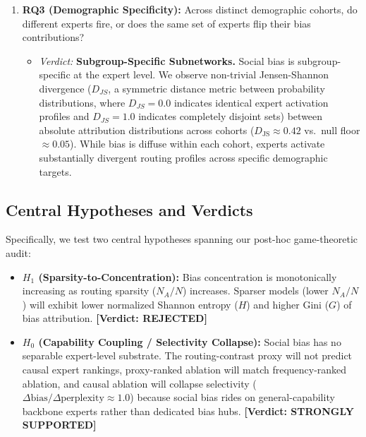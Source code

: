 \documentclass[11pt,a4paper]{article}
\begin{document}
\begin{enumerate}
    \item \textbf{RQ3 (Demographic Specificity):} Across distinct demographic cohorts, do different experts fire, or does the same set of experts flip their bias contributions?
    \begin{itemize}
        \item \textit{Verdict:} \textbf{Subgroup-Specific Subnetworks.} Social bias is subgroup-specific at the expert level. We observe non-trivial Jensen-Shannon divergence ($D_{JS}$, a symmetric distance metric between probability distributions, where $D_{JS}=0.0$ indicates identical expert activation profiles and $D_{JS}=1.0$ indicates completely disjoint sets) between absolute attribution distributions across cohorts ($D_{\text{JS}} \approx 0.42$ vs.\ null floor $\approx 0.05$). While bias is diffuse within each cohort, experts activate substantially divergent routing profiles across specific demographic targets.
    \end{itemize}
\end{enumerate}

\subsection{Central Hypotheses and Verdicts}
Specifically, we test two central hypotheses spanning our post-hoc game-theoretic audit:
\begin{itemize}
    \item \textbf{$H_1$ (Sparsity-to-Concentration):} Bias concentration is monotonically increasing as routing sparsity ($N_A/N$) increases. Sparser models (lower $N_A/N$) will exhibit lower normalized Shannon entropy ($H$) and higher Gini ($G$) of bias attribution. \textbf{[Verdict: REJECTED]}
    \item \textbf{$H_0$ (Capability Coupling / Selectivity Collapse):} Social bias has no separable expert-level substrate. The routing-contrast proxy will not predict causal expert rankings, proxy-ranked ablation will match frequency-ranked ablation, and causal ablation will collapse selectivity ($\Delta\text{bias} / \Delta\text{perplexity} \approx 1.0$) because social bias rides on general-capability backbone experts rather than dedicated bias hubs. \textbf{[Verdict: STRONGLY SUPPORTED]}
\end{itemize}
\end{document}
